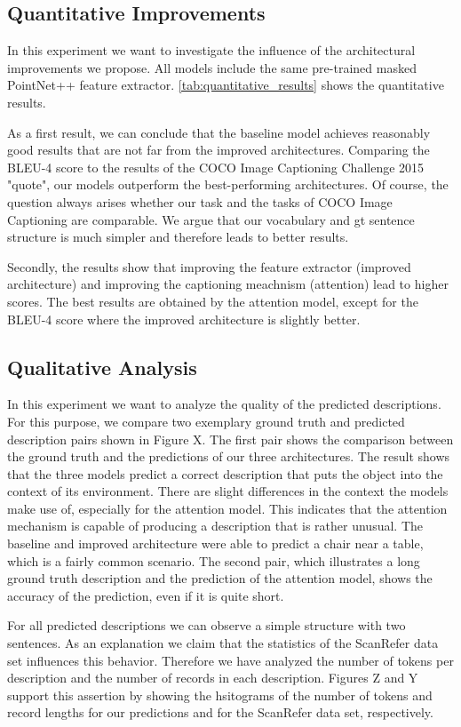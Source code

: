 \documentclass[10pt,twocolumn,letterpaper]{article}
\begin{document}
\subsection{Quantitative Improvements}
In this experiment we want to investigate the influence of the architectural improvements we propose. All models include the same pre-trained masked PointNet++ feature extractor. 
\autoref{tab:quantitative_results} shows the quantitative results. 

As a first result, we can conclude that the baseline model achieves reasonably good results that are not far from the improved architectures. Comparing the BLEU-4 score to the results of the COCO Image Captioning Challenge 2015 "quote", our models outperform the best-performing architectures. Of course, the question always arises whether our task and the tasks of COCO Image Captioning are comparable. We argue that our vocabulary and gt sentence structure is much simpler and therefore leads to better results.

Secondly, the results show that improving the feature extractor (improved architecture) and improving the captioning meachnism (attention) lead to higher scores. The best results are obtained by the attention model, except for the BLEU-4 score where the improved architecture is slightly better.                

\subsection{Qualitative Analysis}
In this experiment we want to analyze the quality of the predicted descriptions. For this purpose, we compare two exemplary ground truth and predicted description pairs shown in Figure X. 
The first pair shows the comparison between the ground truth and the predictions of our three architectures. The result shows that the three models predict a correct description that puts the object into the context of its environment. There are slight differences in the context the models make use of, especially for the attention model. This indicates that the attention mechanism is capable of producing a description that is rather unusual. The baseline and improved architecture were able to predict a chair near a table, which is a fairly common scenario. 
The second pair, which illustrates a long ground truth description and the prediction of the attention model, shows the accuracy of the prediction, even if it is quite short. 

For all predicted descriptions we can observe a simple structure with two sentences. As an explanation we claim that the statistics of the ScanRefer data set influences this behavior. Therefore we have analyzed the number of tokens per description and the number of records in each description. Figures Z and Y support this assertion by showing the hsitograms of the number of tokens and record lengths for our predictions and for the ScanRefer data set, respectively.
\end{document}
